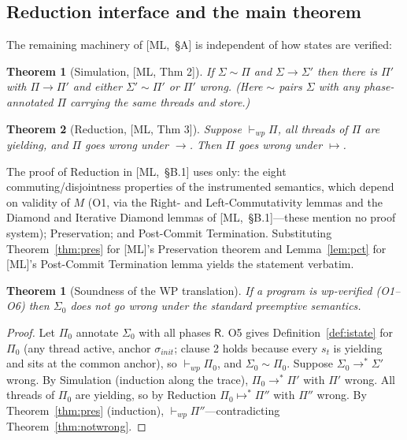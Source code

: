 \documentclass[11pt]{article}
\theoremstyle{plain}
\newtheorem{theorem}{Theorem}
\theoremstyle{plain}
\newtheorem*{namedthm}{Theorem}
\theoremstyle{definition}
\newcommand{\MR}{\mathsf{R}}
\newcommand{\vdashwp}{\vdash_{\mathit{wp}}}
\begin{document}
\subsection{Reduction interface and the main theorem}

The remaining machinery of [ML,~\S A] is independent of how states are verified:

\begin{namedthm}[Simulation, {[ML, Thm 2]}]
If $\Sigma\sim\Pi$ and $\Sigma\to\Sigma'$ then there is $\Pi'$ with $\Pi\to\Pi'$
and either $\Sigma'\sim\Pi'$ or $\Pi'$ wrong. (Here $\sim$ pairs $\Sigma$ with any
phase-annotated $\Pi$ carrying the same threads and store.)
\end{namedthm}

\begin{namedthm}[Reduction, {[ML, Thm 3]}]
Suppose $\vdashwp\Pi$, all threads of $\Pi$ are yielding, and $\Pi$ goes wrong
under $\to$. Then $\Pi$ goes wrong under $\mapsto$.
\end{namedthm}

The proof of Reduction in [ML,~\S B.1] uses only: the eight
commuting/disjointness properties of the instrumented semantics, which depend on
validity of $M$ (O1, via the Right- and Left-Commutativity lemmas and the Diamond
and Iterative Diamond lemmas of [ML,~\S B.1]---these mention no proof system);
Preservation; and Post-Commit Termination. Substituting Theorem~\ref{thm:pres} for
[ML]'s Preservation theorem and Lemma~\ref{lem:pct} for [ML]'s Post-Commit
Termination lemma yields the statement verbatim.

\begin{theorem}[Soundness of the WP translation]\label{thm:soundness}
If a program is wp-verified (O1--O6) then $\Sigma_0$ does not go wrong under the
standard preemptive semantics.
\end{theorem}
\begin{proof}
Let $\Pi_0$ annotate $\Sigma_0$ with all phases $\MR$. O5 gives
Definition~\ref{def:istate} for $\Pi_0$ (any thread active, anchor
$\sigma_{\mathit{init}}$; clause 2 holds because every $s_t$ is yielding and sits
at the common anchor), so $\vdashwp\Pi_0$, and $\Sigma_0\sim\Pi_0$. Suppose
$\Sigma_0\to^*\Sigma'$ wrong. By Simulation (induction along the trace),
$\Pi_0\to^*\Pi'$ with $\Pi'$ wrong. All threads of $\Pi_0$ are yielding, so by
Reduction $\Pi_0\mapsto^*\Pi''$ with $\Pi''$ wrong. By Theorem~\ref{thm:pres}
(induction), $\vdashwp\Pi''$---contradicting Theorem~\ref{thm:notwrong}.
\end{proof}
\end{document}
